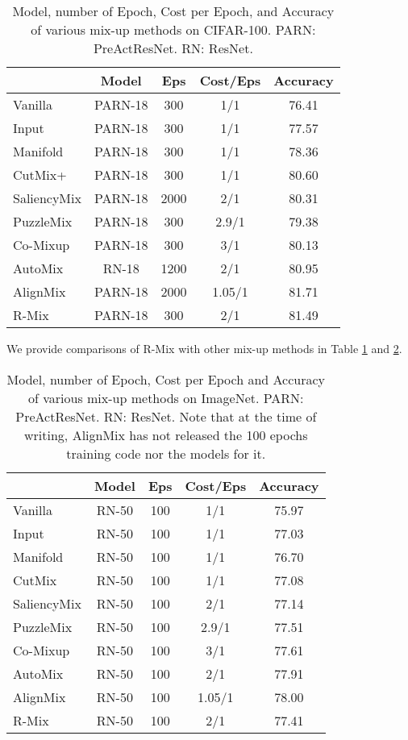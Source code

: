 \documentclass[letterpaper]{article} \usepackage[submission]{aaai23}  \usepackage{times}  \usepackage{helvet}  \usepackage{courier}  \usepackage[hyphens]{url}  \usepackage{graphicx} \urlstyle{rm} \def\UrlFont{\rm}  \usepackage{natbib}  \usepackage{caption} \frenchspacing  \setlength{\pdfpagewidth}{8.5in} \setlength{\pdfpageheight}{11in}
\newcommand{\rrlmix}{{R-Mix}}
\begin{document}
\begin{table}[h!]
\centering
\begin{tabular}{lcccc}
\hline
 & Model & Eps & Cost/Eps & Accuracy \\ \hline
 Vanilla & PARN-18 & 300 & 1/1 & 76.41 \\
Input & PARN-18 & 300 & 1/1 & 77.57 \\
Manifold & PARN-18 & 300 & 1/1 & 78.36 \\
CutMix+ & PARN-18 & 300 & 1/1 & 80.60 \\
SaliencyMix & PARN-18 & 2000 & 2/1 & 80.31 \\
PuzzleMix & PARN-18 & 300 & 2.9/1 & 79.38 \\
Co-Mixup & PARN-18 & 300 & 3/1 & 80.13 \\
AutoMix & RN-18 & 1200 & 2/1 & 80.95 \\
AlignMix & PARN-18 & 2000 & 1.05/1 & 81.71 \\ \hline
R-Mix & PARN-18 & 300 & 2/1 & 81.49 \\ \hline
\end{tabular}
\caption{Model, number of Epoch, Cost per Epoch, and Accuracy of various mix-up methods on CIFAR-100. PARN: PreActResNet. RN: ResNet.}
\label{tab:cifar}
\end{table}

We provide comparisons of \rrlmix{} with other mix-up methods in Table \ref{tab:cifar} and \ref{tab:imagenet}. 

\begin{table}[h!]
\centering
\begin{tabular}{lcccc}
\hline 
 & Model & Eps & Cost/Eps & Accuracy \\ \hline 
Vanilla & RN-50 & 100 & 1/1 & 75.97 \\
Input & RN-50 & 100 & 1/1 & 77.03 \\
Manifold & RN-50 & 100 & 1/1 & 76.70 \\
CutMix & RN-50 & 100 & 1/1 & 77.08 \\
SaliencyMix & RN-50 & 100 & 2/1 & 77.14 \\
PuzzleMix & RN-50 & 100 & 2.9/1 & 77.51 \\
Co-Mixup & RN-50 & 100 & 3/1 & 77.61 \\
AutoMix & RN-50 & 100 & 2/1 & 77.91 \\
AlignMix & RN-50 & 100 & 1.05/1 & 78.00 \\ \hline 
R-Mix & RN-50 & 100 & 2/1 & 77.41 \\ \hline 
\end{tabular}
\caption{Model, number of Epoch, Cost per Epoch and Accuracy of various mix-up methods on ImageNet. PARN: PreActResNet. RN: ResNet. Note that at the time of writing, AlignMix has not released the 100 epochs training code nor the models for it.}
\label{tab:imagenet}
\end{table}
\end{document}

